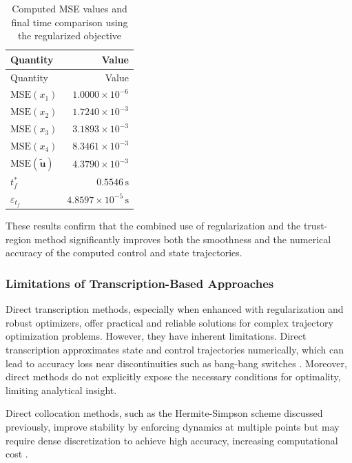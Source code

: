 \documentclass[
  number,
  preprint]{elsarticle}
\begin{document}
\begin{longtable}[]{@{}lr@{}}
\caption{Computed MSE values and final time comparison using the
regularized objective}\label{tbl-ch2-mse-reg}\tabularnewline
\toprule\noalign{}
Quantity & Value \\
\midrule\noalign{}
\endfirsthead
\toprule\noalign{}
Quantity & Value \\
\midrule\noalign{}
\endhead
\bottomrule\noalign{}
\endlastfoot
\(\text{MSE}(x_1)\) & \(1.0000 \times 10^{-6}\) \\
\(\text{MSE}(x_2)\) & \(1.7240 \times 10^{-3}\) \\
\(\text{MSE}(x_3)\) & \(3.1893 \times 10^{-3}\) \\
\(\text{MSE}(x_4)\) & \(8.3461 \times 10^{-3}\) \\
\(\text{MSE}(\mathbf{\tilde{u}})\) & \(4.3790 \times 10^{-3}\) \\
\(t_f^{*}\) & \(0.5546 \, \text{s}\) \\
\(\varepsilon_{t_f}\) & \(4.8597 \times 10^{-5} \, \text{s}\) \\
\end{longtable}

These results confirm that the combined use of regularization and the
trust-region method significantly improves both the smoothness and the
numerical accuracy of the computed control and state trajectories.

\subsubsection{Limitations of Transcription-Based
Approaches}\label{limitations-of-transcription-based-approaches}

Direct transcription methods, especially when enhanced with
regularization and robust optimizers, offer practical and reliable
solutions for complex trajectory optimization problems. However, they
have inherent limitations. Direct transcription approximates state and
control trajectories numerically, which can lead to accuracy loss near
discontinuities such as bang-bang switches \citep{sanchez2018real}.
Moreover, direct methods do not explicitly expose the necessary
conditions for optimality, limiting analytical insight.

Direct collocation methods, such as the Hermite-Simpson scheme discussed
previously, improve stability by enforcing dynamics at multiple points
but may require dense discretization to achieve high accuracy,
increasing computational cost \citep{rao2010survey}.
\end{document}
